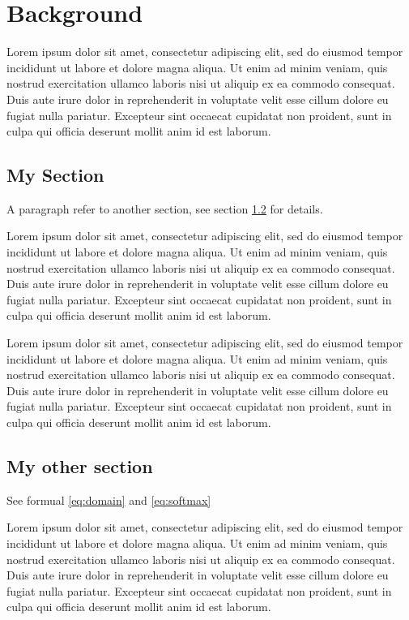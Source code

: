 \chapter{Background}\label{ch2}

Lorem ipsum dolor sit amet, consectetur adipiscing elit,
sed do eiusmod tempor incididunt ut labore et dolore magna aliqua.
Ut enim ad minim veniam, quis nostrud exercitation ullamco laboris nisi ut aliquip ex ea commodo consequat.
Duis aute irure dolor in reprehenderit in voluptate velit esse cillum dolore eu fugiat nulla pariatur.
Excepteur sint occaecat cupidatat non proident, sunt in culpa qui officia deserunt mollit anim id est laborum.

\section{My Section}

A paragraph refer to another section, see section \ref{other_sec} for details.

Lorem ipsum dolor sit amet, consectetur adipiscing elit,
sed do eiusmod tempor incididunt ut labore et dolore magna aliqua.
Ut enim ad minim veniam, quis nostrud exercitation ullamco laboris nisi ut aliquip ex ea commodo consequat.
Duis aute irure dolor in reprehenderit in voluptate velit esse cillum dolore eu fugiat nulla pariatur.
Excepteur sint occaecat cupidatat non proident, sunt in culpa qui officia deserunt mollit anim id est laborum.

Lorem ipsum dolor sit amet, consectetur adipiscing elit,
sed do eiusmod tempor incididunt ut labore et dolore magna aliqua.
Ut enim ad minim veniam, quis nostrud exercitation ullamco laboris nisi ut aliquip ex ea commodo consequat.
Duis aute irure dolor in reprehenderit in voluptate velit esse cillum dolore eu fugiat nulla pariatur.
Excepteur sint occaecat cupidatat non proident, sunt in culpa qui officia deserunt mollit anim id est laborum.


\section{My other section}\label{other_sec}

See formual \ref{eq:domain} and \ref{eq:softmax}

Lorem ipsum dolor sit amet, consectetur adipiscing elit,
sed do eiusmod tempor incididunt ut labore et dolore magna aliqua.
Ut enim ad minim veniam, quis nostrud exercitation ullamco laboris nisi ut aliquip ex ea commodo consequat.
Duis aute irure dolor in reprehenderit in voluptate velit esse cillum dolore eu fugiat nulla pariatur.
Excepteur sint occaecat cupidatat non proident, sunt in culpa qui officia deserunt mollit anim id est laborum.

